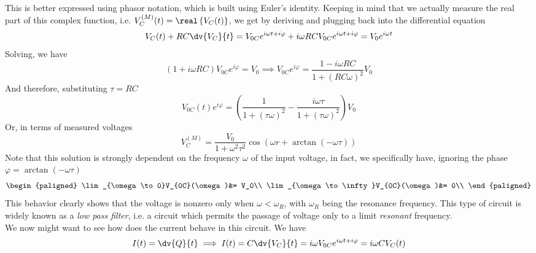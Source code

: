 \documentclass[../electromagnetism.tex]{subfiles}
\begin{document}
This is better expressed using phasor notation, which is built using Euler's identity. Keeping in mind that we actually measure the real part of this complex function, i.e. $V_C^{(M)}(t)=\real\left\{ V_{C}(t) \right\}$, we get by deriving and plugging back into the differential equation
\begin{equation*}
	V_C(t)+RC\dv{V_C}{t}=V_{0C}e^{i\omega t+i\varphi}+i\omega RCV_{0C}e^{i\omega t+i\varphi}=V_0e^{i\omega t}
\end{equation*}
Solving, we have
\begin{equation*}
	\left( 1+i\omega RC \right)V_{0C}e^{i\varphi}=V_0\implies V_{0C}e^{i\varphi}=\frac{1-i\omega RC}{1+\left( RC\omega \right)^2}V_0
\end{equation*}
And therefore, substituting $\tau=RC$
\begin{equation}
	V_{0C}(t)e^{i\varphi}=\left( \frac{1}{1+\left( \tau\omega \right)^2}-\frac{i\omega \tau}{1+\left( \tau\omega \right)^2} \right)V_0
	\label{eq:solutionrcac.ac}
\end{equation}
Or, in terms of measured voltages
\begin{equation}
	V_{C}^{(M)}=\frac{V_0}{1+\omega^2\tau^2}\cos\left( \omega r+\arctan\left( -\omega\tau \right) \right)
	\label{eq:measuredvoltrc.ac}
\end{equation}
Note that this solution is strongly dependent on the frequency $\omega$ of the input voltage, in fact, we specifically have, ignoring the phase $\varphi=\arctan\left( -\omega\tau \right)$
\begin{equation}
	\begin{paligned}
		\lim_{\omega\to0}V_{0C}(\omega)&= V_0\\
		\lim_{\omega\to\infty}V_{0C}(\omega)&= 0\\
	\end{paligned}
	\label{eq:filterbehaviorrc.ac}
\end{equation}
This behavior clearly shows that the voltage is nonzero only when $\omega<\omega_R$, with $\omega_R$ being the resonance frequency. This type of circuit is widely known as a \textit{low pass filter}, i.e. a circuit which permits the passage of voltage only to a limit \textit{resonant} frequency.\\
We now might want to see how does the current behave in this circuit. We have
\begin{equation*}
	I(t)=\dv{Q}{t}\implies I(t)=C\dv{V_C}{t}=i\omega V_{0C}e^{i\omega t +i\varphi}=i\omega CV_{C}(t)
\end{equation*}
\end{document}
